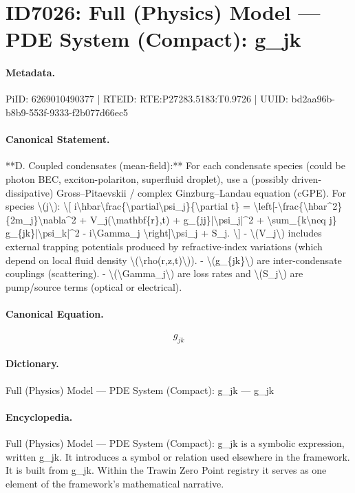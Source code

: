 \section*{ID7026: Full (Physics) Model — PDE System (Compact): g\_jk}
\paragraph{Metadata.}
PiID: 6269010490377 | RTEID: RTE:P27283.5183:T0.9726 | UUID: bd2aa96b-b8b9-553f-9333-f2b077d66ec5

\paragraph{Canonical Statement.}
**D. Coupled condensates (mean-field):** For each condensate species (could be photon BEC, exciton-polariton, superfluid droplet), use a (possibly driven-dissipative) Gross–Pitaevskii / complex Ginzburg–Landau equation (cGPE). For species \textbackslash{}(j\textbackslash{}): \textbackslash{}[ i\textbackslash{}hbar\textbackslash{}frac\{\textbackslash{}partial\textbackslash{}psi\_j\}\{\textbackslash{}partial t\} = \textbackslash{}left[-\textbackslash{}frac\{\textbackslash{}hbar\textasciicircum{}2\}\{2m\_j\}\textbackslash{}nabla\textasciicircum{}2 + V\_j(\textbackslash{}mathbf\{r\},t) + g\_\{jj\}|\textbackslash{}psi\_j|\textasciicircum{}2 + \textbackslash{}sum\_\{k\textbackslash{}neq j\} g\_\{jk\}|\textbackslash{}psi\_k|\textasciicircum{}2 - i\textbackslash{}Gamma\_j \textbackslash{}right]\textbackslash{}psi\_j + S\_j. \textbackslash{}] - \textbackslash{}(V\_j\textbackslash{}) includes external trapping potentials produced by refractive-index variations (which depend on local fluid density \textbackslash{}(\textbackslash{}rho(r,z,t)\textbackslash{})). - \textbackslash{}(g\_\{jk\}\textbackslash{}) are inter-condensate couplings (scattering). - \textbackslash{}(\textbackslash{}Gamma\_j\textbackslash{}) are loss rates and \textbackslash{}(S\_j\textbackslash{}) are pump/source terms (optical or electrical).

\paragraph{Canonical Equation.}
\[
g_{jk}
\]

\paragraph{Dictionary.}
Full (Physics) Model — PDE System (Compact): g\_jk — g\_jk

\paragraph{Encyclopedia.}
Full (Physics) Model — PDE System (Compact): g\_jk is a symbolic expression, written g\_jk. It introduces a symbol or relation used elsewhere in the framework. It is built from g\_jk. Within the Trawin Zero Point registry it serves as one element of the framework's mathematical narrative.
